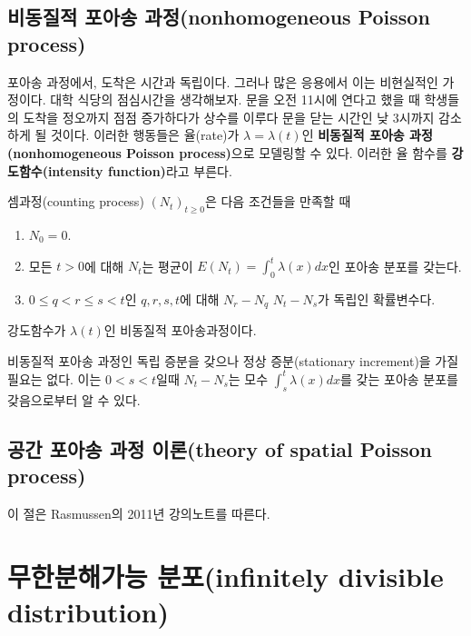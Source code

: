 \documentclass[b5paper,]{scrbook}
\theoremstyle{plain}
\theoremstyle{definition}
\numberwithin{equation}{section}
\let\BeginKnitrBlock\begin \let\EndKnitrBlock\end
\begin{document}
\hypertarget{--nonhomogeneous-poisson-process}{%
\subsection{비동질적 포아송 과정(nonhomogeneous Poisson process)}\label{--nonhomogeneous-poisson-process}}

포아송 과정에서, 도착은 시간과 독립이다. 그러나 많은 응용에서 이는 비현실적인 가정이다. 대학 식당의 점심시간을 생각해보자. 문을 오전 11시에 연다고 했을 때 학생들의 도착을 정오까지 점점 증가하다가 상수를 이루다 문을 닫는 시간인 낮 3시까지 감소하게 될 것이다. 이러한 행동들은 율(rate)가 \(\lambda=\lambda(t)\)인 \textbf{비동질적 포아송 과정(nonhomogeneous Poisson process)}으로 모델링할 수 있다. 이러한 율 함수를 \textbf{강도함수(intensity function)}라고 부른다.

\BeginKnitrBlock{definition}[비동질적 포아송 과정]
\protect\hypertarget{def:unnamed-chunk-159}{}{\label{def:unnamed-chunk-159} {} }셈과정(counting process) \((N_{t})_{t\geq 0}\)은 다음 조건들을 만족할 때

\begin{enumerate}
\def\labelenumi{\arabic{enumi}.}
\item
  \(N_{0}=0\).
\item
  모든 \(t>0\)에 대해 \(N_{t}\)는 평균이 \(E(N_{t})=\int_{0}^{t}\lambda(x)dx\)인 포아송 분포를 갖는다.
\item
  \(0\leq q < r \leq s < t\)인 \(q,r,s,t\)에 대해 \(N_{r}-N_{q}\) \(N_{t}-N_{s}\)가 독립인 확률변수다.
\end{enumerate}

강도함수가 \(\lambda(t)\)인 비동질적 포아송과정이다.
\EndKnitrBlock{definition}

비동질적 포아송 과정인 독립 증분을 갖으나 정상 증분(stationary increment)을 가질 필요는 없다. 이는 \(0<s<t\)일때 \(N_{t}-N_{s}\)는 모수 \(\int_{s}^{t}\lambda(x)dx\)를 갖는 포아송 분포를 갖음으로부터 알 수 있다.

\hypertarget{---theory-of-spatial-poisson-process}{%
\subsection{공간 포아송 과정 이론(theory of spatial Poisson process)}\label{---theory-of-spatial-poisson-process}}

이 절은 Rasmussen의 2011년 강의노트를 따른다.

\hypertarget{-infinitely-divisible-distribution}{%
\section{무한분해가능 분포(infinitely divisible distribution)}\label{-infinitely-divisible-distribution}}
\end{document}
